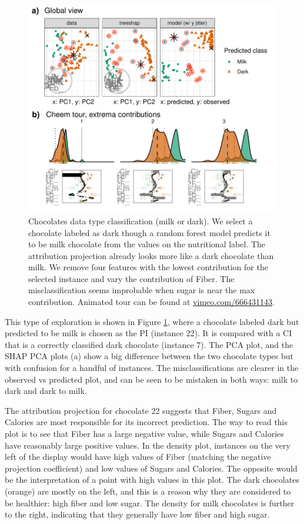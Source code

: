 \documentclass[
]{article}
\begin{document}
\begin{figure}

{\centering \includegraphics[width=1\linewidth]{./figures/case_chocolates} 

}

\caption{Chocolates data type classification (milk or dark). We select a chocolate labeled as dark though a random forest model predicts it to be milk chocolate from the values on the nutritional label. The attribution projection already looks more like a dark chocolate than milk. We remove four features with the lowest contribution for the selected instance and vary the contribution of Fiber. The misclassification seems improbable when sugar is near the max contribution. Animated tour can be found at \href{https://vimeo.com/666431143}{vimeo.com/666431143}.}\label{fig:casechocolates}
\end{figure}

This type of exploration is shown in Figure \ref{fig:casechocolates}, where a chocolate labeled dark but predicted to be milk is chosen as the PI (instance 22). It is compared with a CI that is a correctly classified dark chocolate (instance 7). The PCA plot, and the SHAP PCA plots (a) show a big difference between the two chocolate types but with confusion for a handful of instances. The misclassifications are clearer in the observed vs predicted plot, and can be seen to be mistaken in both ways: milk to dark and dark to milk.

The attribution projection for chocolate 22 suggests that Fiber, Sugars and Calories are most responsible for its incorrect prediction. The way to read this plot is to see that Fiber has a large negative value, while Sugars and Calories have reasonably large positive values. In the density plot, instances on the very left of the display would have high values of Fiber (matching the negative projection coefficient) and low values of Sugars and Calories. The opposite would be the interpretation of a point with high values in this plot. The dark chocolates (orange) are mostly on the left, and this is a reason why they are considered to be healthier: high fiber and low sugar. The density for milk chocolates is further to the right, indicating that they generally have low fiber and high sugar.
\end{document}
